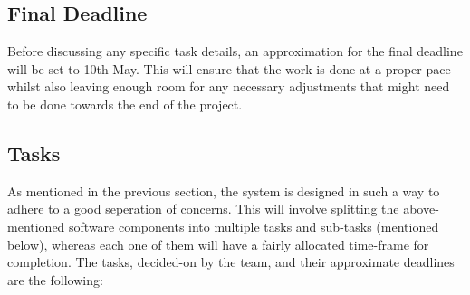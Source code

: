 \documentclass[11pt,a4paper,twocolumn]{scrartcl}
\begin{document}
\subsection{Final Deadline}
Before discussing any specific task details, an approximation for the final deadline will be set to 10th May. This will ensure that the work is done at a proper pace whilst also
leaving enough room for any necessary adjustments that might need to be done towards the end of the project.

\subsection{Tasks}
As mentioned in the previous section, the system is designed in such a way to adhere to a good seperation of concerns. This will involve splitting the above-mentioned software
components into multiple tasks and sub-tasks (mentioned below), whereas each one of them will have a fairly allocated time-frame for completion.
The tasks, decided-on by the team, and their approximate deadlines are the following:
\end{document}
